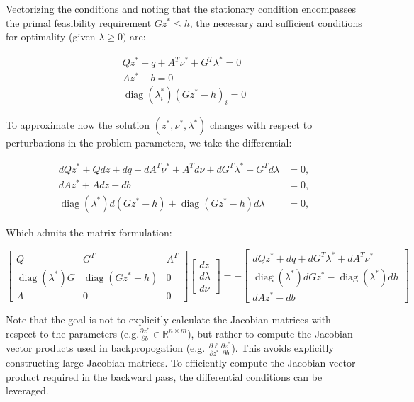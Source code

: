 \documentclass{article}
\DeclareMathOperator{\diag}{diag}
\begin{document}
Vectorizing the conditions and noting that the stationary condition encompasses the primal feasibility requirement $Gz^* \leq h$, the necessary and sufficient conditions for optimality (given $\lambda \geq 0)$ are: 

\begin{equation}
    \begin{aligned}
        Qz^* + q + A^T\nu^* + G^T\lambda^* = 0 \\
        Az^* - b = 0\\
        \diag({\lambda_i^*})(Gz^* - h)_i = 0
    \end{aligned}
\end{equation}

To approximate how the solution $(z^*, \nu^*, \lambda^*)$ changes with respect to perturbations in the problem parameters, we take the differential:


\begin{equation}
    \begin{aligned}
        dQ z^* + Q dz + dq + dA^T \nu^* + A^T d\nu + dG^T \lambda^* + G^T d\lambda &= 0, \\
        dA z^* + A dz - db &= 0, \\
        \diag(\lambda^*) d(Gz^* - h) + \diag(Gz^* - h) d\lambda &= 0,
    \end{aligned}
\end{equation}

Which admits the matrix formulation:

\begin{equation}
    \begin{bmatrix}
        Q & G^T & A^T \\
        \diag(\lambda^*) G & \diag(Gz^* - h) & 0 \\
        A & 0 & 0
    \end{bmatrix}
    \begin{bmatrix}
        dz \\
        d\lambda \\
        d\nu
    \end{bmatrix}
    =
    -\begin{bmatrix}
        dQ z^* + dq + dG^T \lambda^* + dA^T \nu^* \\
        \diag(\lambda^*) dG z^* - \diag(\lambda^*) dh \\
        dA z^* - db
    \end{bmatrix}
\end{equation}

Note that the goal is not to explicitly calculate the Jacobian matrices with respect to the parameters (e.g.$\frac{\partial z^*}{\partial b} \in \mathbb{R}^{n \times m}$), but rather to compute the Jacobian-vector products used in backpropogation (e.g. $\frac{\partial \ell}{\partial z^*} \frac{\partial z^*}{\partial b}$). This avoids explicitly constructing large Jacobian matrices.
To efficiently compute the Jacobian-vector product required in the backward pass, the differential conditions can be leveraged. 
\end{document}
